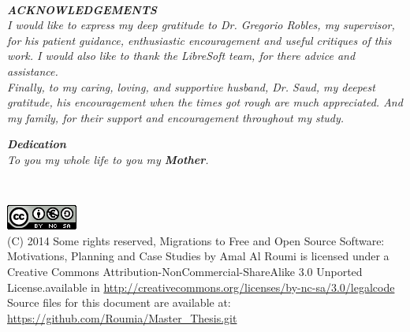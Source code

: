 \documentclass[a4paper, 12pt]{book}
\begin{document}
\newpage
~
\thispagestyle{empty}
\vspace{3cm}
\begin{flushright}
\textbf{\textit{ACKNOWLEDGEMENTS}} \\
\textit{I would like to express my deep gratitude to Dr. Gregorio Robles, my
  supervisor, for his patient guidance, enthusiastic encouragement and
  useful critiques of this work.
I would also like to thank the LibreSoft team,  for there advice and assistance. \\
Finally, to my caring, loving, and supportive husband, Dr. Saud,  my
deepest gratitude, his encouragement when the times got rough are much appreciated. And my family,  for their support and encouragement throughout my study.
 }
 
 \vspace{2cm}
\textbf{\textit{Dedication}} \\
\textit{To you my whole life to you my   \textbf{Mother}.}
\end{flushright}
\newpage
\thispagestyle{empty}
~
\newpage
~
\thispagestyle{empty}
\vspace{16cm}
\begin{flushright}
\includegraphics[scale=1.2]{img/cc-by-ns.png} \\

(C) 2014 Some rights reserved, Migrations to Free and Open Source Software:
Motivations, Planning and Case Studies by Amal Al Roumi is licensed under a Creative Commons Attribution-NonCommercial-ShareAlike 3.0 Unported  License.available in
 \url {http://creativecommons.org/licenses/by-nc-sa/3.0/legalcode}
Source files for this document are available at: \url{https://github.com/Roumia/Master_Thesis.git}

\end{flushright}
\newpage
~
\thispagestyle{empty}
\tableofcontents  
\listoffigures  

\end{document}
